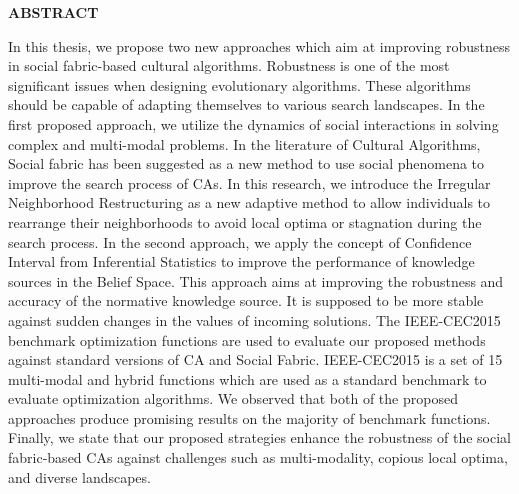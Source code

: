 \newpage
{}


\begin{center}
\textbf{ABSTRACT}
\end{center}

In this thesis, we propose two new approaches which aim at improving robustness in social fabric-based cultural algorithms. Robustness is one of the most significant issues when designing evolutionary algorithms. These algorithms should be capable of adapting themselves to various search landscapes. \newline In the first proposed approach, we utilize the dynamics of social interactions in solving complex and multi-modal problems. In the literature of Cultural Algorithms, Social fabric has been suggested as a new method to use social phenomena to improve the search process of CAs. In this research, we introduce the Irregular Neighborhood Restructuring as a new adaptive method to allow individuals to rearrange their neighborhoods to avoid local optima or stagnation during the search process.\newline 
In the second approach, we apply the concept of Confidence Interval from Inferential Statistics to improve the performance of knowledge sources in the Belief Space. This approach aims at improving the robustness and accuracy of the normative knowledge source. It is supposed to be more stable against sudden changes in the values of incoming solutions.\newline 
The IEEE-CEC2015 benchmark optimization functions are used to evaluate our proposed methods against standard versions of CA and Social Fabric. IEEE-CEC2015 is a set of 15 multi-modal and hybrid functions which are used as a standard benchmark to evaluate optimization algorithms. We observed that both of the proposed approaches produce promising results on the majority of benchmark functions. Finally, we state that our proposed strategies enhance the robustness of the social fabric-based CAs against challenges such as multi-modality, copious local optima, and diverse landscapes.
